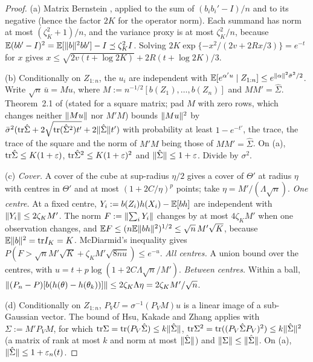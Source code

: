 \begin{proof}
(a) Matrix Bernstein \citep[Theorem 1.4]{tropp2012}, applied to the sum of $(b_ib_i' - I)/n$ and to its negative (hence the factor $2K$ for the operator norm). Each summand has norm at most $(\zeta_K^2 + 1)/n$, and the variance proxy is at most $\zeta_K^2/n$, because $\mathbb{E}(bb' - I)^2 = \mathbb{E}[\lVert b\rVert^2bb'] - I \preceq \zeta_K^2I$. Solving $2K\exp\{-x^2/(2v + 2Rx/3)\} = e^{-t}$ for $x$ gives $x \le \sqrt{2v(t + \log 2K)} + 2R(t + \log 2K)/3$.

(b) Conditionally on $Z_{1:n}$, the $u_i$ are independent with $\mathbb{E}[e^{\alpha'u} \mid Z_{1:n}] \le e^{\lVert \alpha\rVert^2\bar\sigma^2/2}$. Write $\sqrt n\,\bar u = Mu$, where $M := n^{-1/2}[b(Z_1), \dots, b(Z_n)]$ and $MM' = \hat\Sigma$. Theorem~2.1 of \citet{hsukakadezhang2012} (stated for a square matrix; pad $M$ with zero rows, which changes neither $\lVert Mu\rVert$ nor $M'M$) bounds $\lVert Mu\rVert^2$ by $\bar\sigma^2(\mathrm{tr}\hat\Sigma + 2\sqrt{\mathrm{tr}(\hat\Sigma^2)t'} + 2\lVert \hat\Sigma\rVert t')$ with probability at least $1 - e^{-t'}$, the trace, the trace of the square and the norm of $M'M$ being those of $MM' = \hat\Sigma$. On (a), $\mathrm{tr}\hat\Sigma \le K(1 + \varepsilon)$, $\mathrm{tr}\hat\Sigma^2 \le K(1 + \varepsilon)^2$ and $\lVert \hat\Sigma\rVert \le 1 + \varepsilon$. Divide by $\sigma^2$.

(c) \emph{Cover.} A cover of the cube at sup-radius $\eta/2$ gives a cover of $\Theta'$ at radius $\eta$ with centres in $\Theta'$ and at most $(1 + 2C/\eta)^p$ points; take $\eta = M'/(\Lambda\sqrt n)$. \emph{One centre.} At a fixed centre, $Y_i := b(Z_i)h(X_i) - \mathbb{E}[bh]$ are independent with $\lVert Y_i\rVert \le 2\zeta_KM'$. The norm $F := \lVert \sum_iY_i\rVert$ changes by at most $4\zeta_KM'$ when one observation changes, and $\mathbb{E} F \le (n\mathbb{E}\lVert bh\rVert^2)^{1/2} \le \sqrt n\,M'\sqrt K$, because $\mathbb{E}\lVert b\rVert^2 = \mathrm{tr} I_K = K$. McDiarmid's inequality \citep{mcdiarmid1989} gives $P(F > \sqrt nM'\sqrt K + \zeta_KM'\sqrt{8nu}) \le e^{-u}$. \emph{All centres.} A union bound over the centres, with $u = t + p\log(1 + 2C\Lambda\sqrt n/M')$. \emph{Between centres.} Within a ball, $\lVert (P_n - P)[b(h(\theta) - h(\theta_k))]\rVert \le 2\zeta_K\Lambda\eta = 2\zeta_KM'/\sqrt n$.

(d) Conditionally on $Z_{1:n}$, $P_VU = \sigma^{-1}(P_VM)u$ is a linear image of a sub-Gaussian vector. The bound of Hsu, Kakade and Zhang applies with $\Sigma := M'P_VM$, for which $\mathrm{tr}\Sigma = \mathrm{tr}(P_V\hat\Sigma) \le k\lVert \hat\Sigma\rVert$, $\mathrm{tr}\Sigma^2 = \mathrm{tr}((P_V\hat\Sigma P_V)^2) \le k\lVert \hat\Sigma\rVert^2$ (a matrix of rank at most $k$ and norm at most $\lVert \hat\Sigma\rVert$) and $\lVert \Sigma\rVert \le \lVert \hat\Sigma\rVert$. On (a), $\lVert \hat\Sigma\rVert \le 1 + \varepsilon_n(t)$.
\end{proof}


